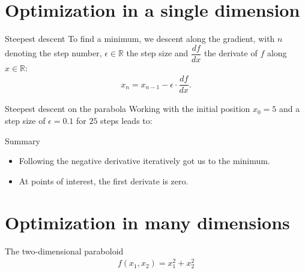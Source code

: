 \documentclass[notes]{beamer}
\begin{document}
    \section{Optimization in a single dimension}
    \begin{frame}{Steepest descent}
      To find a minimum, we descent along the gradient, with $n$ denoting the step number,
      $\epsilon \in \mathbb{R}$ the step size and $\dfrac{d f}{dx}$ the derivate of $f$ along 
      $x \in \mathbb{R}$:
      \begin{align}
        x_n = x_{n-1} - \epsilon \cdot \dfrac{d f}{dx}.
      \end{align}
    \end{frame}


    \begin{frame}{Steepest descent on the parabola}
      Working with the initial position $x_0 = 5$ and a step size of $\epsilon = 0.1$ for $25$ steps leads to: 
      \begin{figure}
        
        
      \end{figure}
    \end{frame}

    \begin{frame}{Summary}
      \begin{itemize}
        \item Following the negative derivative iteratively got us to the minimum.
        \item At points of interest, the first derivate is zero. 
      \end{itemize}
    \end{frame}

    \section{Optimization in many dimensions}

    \begin{frame}{The two-dimensional paraboloid}
      \begin{align}
        f(x_1, x_2) = x_1^2 + x_2^2
      \end{align}
      \begin{figure}
        \centering
        
      \end{figure}
    \end{frame}
\end{document}
